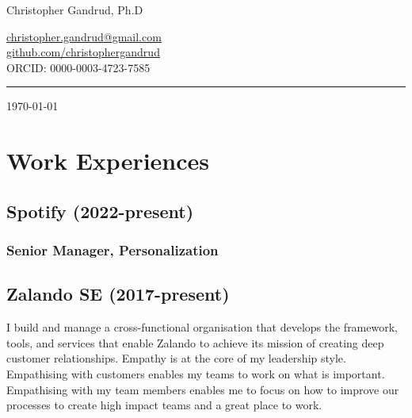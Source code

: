 \documentclass[a4paper]{article}
\begin{document}
    \begin{flushright}
        {\huge{Christopher Gandrud, Ph.D}} \\
        \vspace{0.251cm}

        \href{mailto:christopher.gandrud@gmail.com}{christopher.gandrud@gmail.com}\\
        \href{https://github.com/christophergandrud}{github.com/christophergandrud}\\[0.25cm]

        ORCID: 0000-0003-4723-7585\\[0.25cm]

        \medskip\hrule height 1pt

        \vspace{0.5cm}

        \today

    \end{flushright}



\vspace{0.5cm}

\section*{Work Experiences}

\subsection*{Spotify (2022-present)}

\subsubsection*{Senior Manager, Personalization}

\subsection*{Zalando SE (2017-present)}

I build and manage a cross-functional organisation that develops the framework, tools, and services that enable Zalando to achieve its mission of creating deep customer relationships. Empathy is at the core of my leadership style. Empathising with customers enables my teams to work on what is important. Empathising with my team members enables me to focus on how to improve our processes to create high impact teams and a great place to work.
\end{document}
